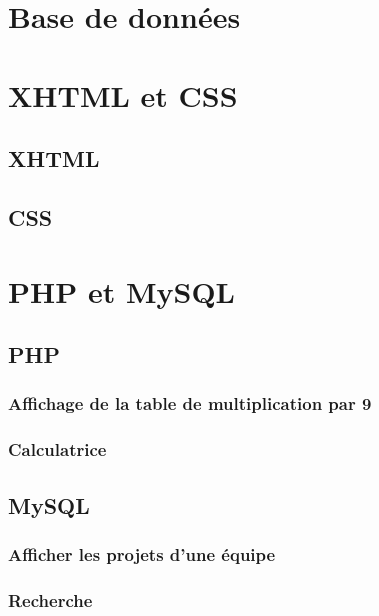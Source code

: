 \documentclass[12pt,a4paper,openany]{book}
\begin{document}
	\setcounter{tocdepth}{2}
	\setcounter{secnumdepth}{3}
	\maketitle
	\tableofcontents
	\part{Base de données}
	
	
	\part{XHTML et CSS}
	\chapter{XHTML}
	
	
	
	\chapter{CSS}
	\part{PHP et MySQL}
	\chapter{PHP}
	\section{Affichage de la table de multiplication par 9}
	
	
	\section{Calculatrice}
	
	
	\chapter{MySQL}
	\section{Afficher les projets d'une équipe}
	
	
	\section{Recherche}
	
	
\end{document}

